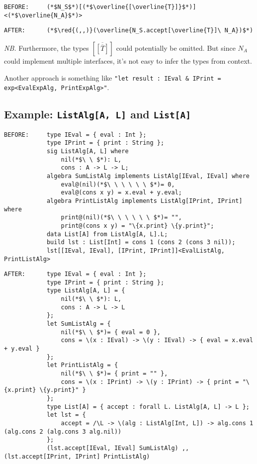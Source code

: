 \documentclass{article}
\newcommand{\red}[1]{\textcolor{red}{#1}}
\newcommand{\nb}{\textit{NB. }}
\begin{document}
\begin{spacing}{1.1}
\begin{lstlisting}[numbers=none]
BEFORE:     (*$N_S$*)[(*$\overline{[\overline{T}]}$*)]<(*$\overline{N_A}$*)>
\end{lstlisting}
\begin{lstlisting}[numbers=none]
AFTER:      (*$\red{(,,)}(\overline{N_S.accept[\overline{T}]\ N_A})$*)
\end{lstlisting}

\nb Furthermore, the types $[\overline{[\overline{T}]}]$ could potentially be omitted. But since $N_A$ could implement multiple interfaces, it's not easy to infer the types from context.

Another approach is something like \lstinline{"let result : IEval & IPrint = exp<EvalExpAlg, PrintExpAlg>"}.

\subsection{Example: \lstinline{ListAlg[A, L]} and \lstinline{List[A]}}

\begin{lstlisting}[numbers=none]
BEFORE:     type IEval = { eval : Int };
            type IPrint = { print : String };
            sig ListAlg[A, L] where
                nil(*$\ \ $*): L,
                cons : A -> L -> L;
            algebra SumListAlg implements ListAlg[IEval, IEval] where
                eval@(nil)(*$\ \ \ \ \ \ $*)= 0,
                eval@(cons x y) = x.eval + y.eval;
            algebra PrintListAlg implements ListAlg[IPrint, IPrint] where
                print@(nil)(*$\ \ \ \ \ \ $*)= "",
                print@(cons x y) = "\{x.print} \{y.print}";
            data List[A] from ListAlg[A, L].L;
            build lst : List[Int] = cons 1 (cons 2 (cons 3 nil));
            lst[[IEval, IEval], [IPrint, IPrint]]<EvalListAlg, PrintListAlg>
\end{lstlisting}
\begin{lstlisting}[numbers=none]
AFTER:      type IEval = { eval : Int };
            type IPrint = { print : String };
            type ListAlg[A, L] = {
                nil(*$\ \ $*): L,
                cons : A -> L -> L
            };
            let SumListAlg = {
                nil(*$\ \ $*)= { eval = 0 },
                cons = \(x : IEval) -> \(y : IEval) -> { eval = x.eval + y.eval }
            };
            let PrintListAlg = {
                nil(*$\ \ $*)= { print = "" },
                cons = \(x : IPrint) -> \(y : IPrint) -> { print = "\{x.print} \{y.print}" }
            };
            type List[A] = { accept : forall L. ListAlg[A, L] -> L };
            let lst = {
                accept = /\L -> \(alg : ListAlg[Int, L]) -> alg.cons 1 (alg.cons 2 (alg.cons 3 alg.nil))
            };
            (lst.accept[IEval, IEval] SumListAlg) ,, (lst.accept[IPrint, IPrint] PrintListAlg)
\end{lstlisting}



\end{spacing}
\end{document}
